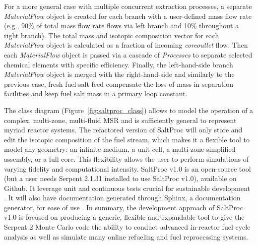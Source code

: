 For a more general case with multiple concurrent extraction processes, a 
separate \textit{MaterialFlow} object is created for each branch with a 
user-defined mass flow rate (e.g., 90\% of total mass flow rate flows via left 
branch and 10\% throughout a right branch). The total mass and isotopic 
composition vector for each \textit{MaterialFlow} object is calculated as a 
fraction of incoming \textit{core\textunderscore outlet} flow. Then each 
\textit{MaterialFlow} object is passed via a cascade of \textit{Processes} to 
separate selected chemical elements with specific efficiency. Finally, the 
left-hand-side branch \textit{MaterialFlow} object is merged with the 
right-hand-side and similarly to the previous case, fresh fuel salt feed 
compensate the loss of mass in separation facilities and keep fuel salt mass 
in a primary loop constant.

The class diagram (Figure~\ref{fig:saltproc_class}) allows to model the 
operation of a complex, multi-zone, multi-fluid \gls{MSR} and is sufficiently 
general to represent myriad reactor systems. The refactored version of 
SaltProc will only store and edit the isotopic composition of the fuel stream, 
which makes it a flexible tool to model any geometry: an infinite medium, a 
unit cell, a multi-zone simplified assembly, or a full core. This flexibility 
allows the user to perform simulations of varying fidelity and computational 
intensity. SaltProc v1.0 is an open-source tool (but a user needs Serpent 
2.1.31 installed to use SaltProc v1.0), available on Github. It leverage unit 
and continuous tests  crucial for sustainable development  
\cite{krekel_pytest_2004}. It will also have documentation generated through 
Sphinx, a documentation generator, for ease of use \cite{brandl_sphinx_2009}. 
In summary, the development approach of SaltProc v1.0 is focused on producing 
a generic, flexible and expandable tool to give the Serpent 2 Monte Carlo code 
the ability to conduct advanced in-reactor fuel cycle analysis as well as 
simulate many online refueling and fuel reprocessing systems.


